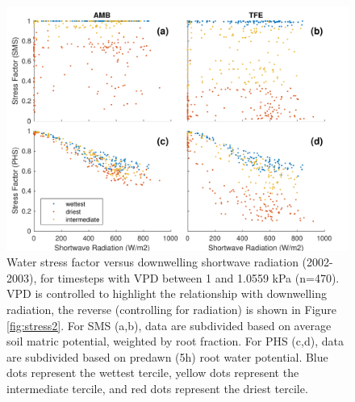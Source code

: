 \documentclass[draft,linenumbers]{agujournal}
\begin{document}
      \begin{figure}[h]
     \centering
     \includegraphics[width=30pc]{../figs3/suppstress.pdf}
     \caption{Water stress factor versus downwelling shortwave radiation (2002-2003), for timesteps with VPD between 1 and 1.0559 kPa (n=470).
     VPD is controlled to highlight the relationship with downwelling radiation, the reverse (controlling for radiation) is shown in Figure \ref{fig:stress2}.
     For SMS (a,b), data are subdivided based on average soil matric potential, weighted by root fraction.
     For PHS (c,d), data are subdivided based on predawn (5h) root water potential.
     Blue dots represent the wettest tercile, yellow dots represent the intermediate tercile, and red dots represent the driest tercile.
     }
     \label{supp:fsds}
       \end{figure}
         \clearpage
\end{document}
